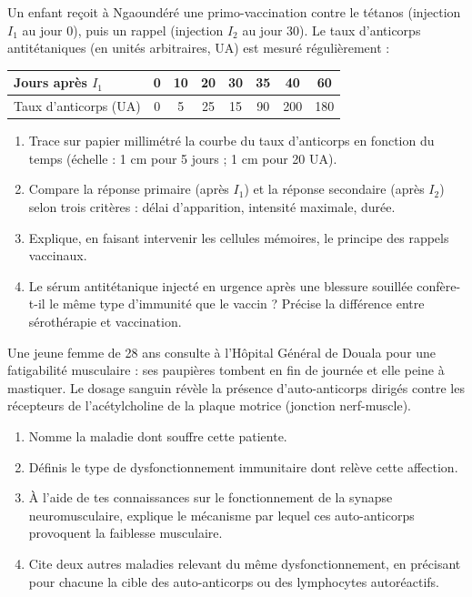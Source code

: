 \documentclass[11pt]{article}
\begin{document}
\begin{exercice}
Un enfant reçoit à Ngaoundéré une primo-vaccination contre le tétanos (injection $I_1$ au jour 0), puis un rappel (injection $I_2$ au jour 30). Le taux d'anticorps antitétaniques (en unités arbitraires, UA) est mesuré régulièrement :
\begin{center}
\begin{tabular}{|l|c|c|c|c|c|c|c|}
\hline
\rowcolor{popblueL} Jours après $I_1$ & 0 & 10 & 20 & 30 & 35 & 40 & 60 \\
\hline
Taux d'anticorps (UA) & 0 & 5 & 25 & 15 & 90 & 200 & 180 \\
\hline
\end{tabular}
\end{center}
\begin{enumerate}
\item Trace sur papier millimétré la courbe du taux d'anticorps en fonction du temps (échelle : 1 cm pour 5 jours ; 1 cm pour 20 UA).
\item Compare la réponse primaire (après $I_1$) et la réponse secondaire (après $I_2$) selon trois critères : délai d'apparition, intensité maximale, durée.
\item Explique, en faisant intervenir les cellules mémoires, le principe des rappels vaccinaux.
\item Le sérum antitétanique injecté en urgence après une blessure souillée confère-t-il le même type d'immunité que le vaccin ? Précise la différence entre sérothérapie et vaccination.
\end{enumerate}
\end{exercice}

\begin{exercice}
Une jeune femme de 28 ans consulte à l'Hôpital Général de Douala pour une fatigabilité musculaire : ses paupières tombent en fin de journée et elle peine à mastiquer. Le dosage sanguin révèle la présence d'auto-anticorps dirigés contre les récepteurs de l'acétylcholine de la plaque motrice (jonction nerf-muscle).
\begin{enumerate}
\item Nomme la maladie dont souffre cette patiente.
\item Définis le type de dysfonctionnement immunitaire dont relève cette affection.
\item À l'aide de tes connaissances sur le fonctionnement de la synapse neuromusculaire, explique le mécanisme par lequel ces auto-anticorps provoquent la faiblesse musculaire.
\item Cite deux autres maladies relevant du même dysfonctionnement, en précisant pour chacune la cible des auto-anticorps ou des lymphocytes autoréactifs.
\end{enumerate}
\end{exercice}
\end{document}
